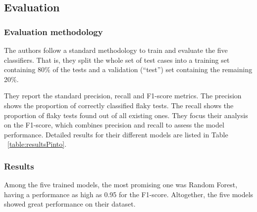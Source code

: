 \subsection{Evaluation}
\subsubsection{Evaluation methodology}
The authors follow a standard methodology to train and evaluate the five classifiers. That is, they split the whole set of test cases into a training set containing 80\% of the tests and a validation (``test'') set containing the remaining 20\%.

\begin{table*}[t]
\vspace{1.0em}
\centering
    \caption{Model performance of the Pinto \etal study~\cite{Pinto2020}}
\label{table:resultsPinto}
\vspace{1.0em}
\end{table*}

They report the standard precision, recall and F1-score metrics. The precision shows the proportion of correctly classified flaky tests. The recall shows the proportion of flaky tests found out of all existing ones. 
They focus their analysis on the F1-score, which combines precision and recall to assess the model performance. Detailed results for their different models are listed in Table ~\ref{table:resultsPinto}.

\subsubsection{Results}
Among the five trained models, the most promising one was Random Forest, having a performance as high as 0.95 for the F1-score. Altogether, the five models showed great performance on their dataset.  
